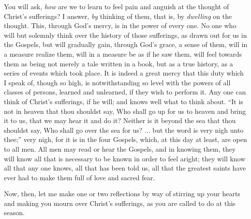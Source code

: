 You will ask, \emph{how} are we to learn to feel pain and anguish
at the thought of Christ's sufferings? I answer, \emph{by} thinking of them,
that is, by \emph{dwelling} on the thought. This, through God's mercy,
is in the power of every one. No one who will but solemnly think over
the history of those sufferings, as drawn out for us in the Gospels,
but will gradually gain, through God's grace, a sense of them, will in
a measure realize them, will in a measure be as if he saw them, will
feel towards them as being not merely a tale written in a book, but as
a true history, as a series of events which took place. It is indeed a
great mercy that this duty which I speak of, though so high, is
notwithstanding so level with the powers of all classes of persons,
learned and unlearned, if they wish to perform it. Any one can think
of Christ's sufferings, if he will; and knows well what to think
about. ``It is not in heaven that thou shouldst say, Who shall go
up for us to heaven and bring it to us, that we may hear it and do it?
Neither is it beyond the sea that thou shouldst say, Who shall go over
the sea for us? ... but the word is very nigh unto thee;'' very
nigh, for it is in the four Gospels, which, at this day at least, are
open to all men. All men may read or hear the Gospels, and in knowing
them, they will know all that is necessary to be known in order to
feel aright; they will know all that any one knows, all that has been
told us, all that the greatest saints have ever had to make them full
of love and sacred fear.

Now, then, let me make one or two reflections by way of stirring up
your hearts and making you mourn over Christ's sufferings, as you are
called to do at this season.

